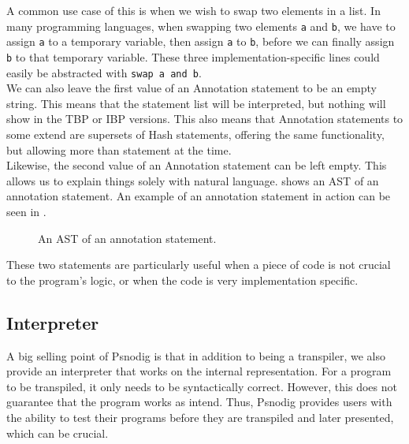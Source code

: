 A common use case of this is when we wish to swap two elements in a list. In many programming languages, when swapping two elements \texttt{a} and \texttt{b}, we have to assign \texttt{a} to a temporary variable, then assign \texttt{a} to \texttt{b}, before we can finally assign \texttt{b} to that temporary variable. These three implementation-specific lines could easily be abstracted with \texttt{swap a and b}. \\

We can also leave the first value of an Annotation statement to be an empty string. This means that the statement list will be interpreted, but nothing will show in the TBP or IBP versions. This also means that Annotation statements to some extend are supersets of Hash statements, offering the same functionality, but allowing more than statement at the time. \\

Likewise, the second value of an Annotation statement can be left empty. This allows us to explain things solely with natural language.  shows an AST of an annotation statement. An example of an annotation statement in action can be seen in . \\

\begin{figure}[ht!]
    \caption{An AST of an annotation statement.}
    \label{An AST of an annotation statement.}
\end{figure}

These two statements are particularly useful when a piece of code is not crucial to the program's logic, or when the code is very implementation specific.

\subsection{Interpreter}

A big selling point of Psnodig is that in addition to being a transpiler, we also provide an interpreter that works on the internal representation. For a program to be transpiled, it only needs to be syntactically correct. However, this does not guarantee that the program works as intend. Thus, Psnodig provides users with the ability to test their programs before they are transpiled and later presented, which can be crucial. \\


